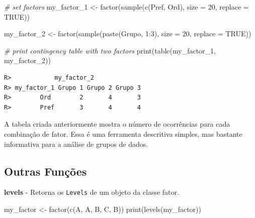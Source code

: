 \documentclass[
  11pt,
]{book}
\newenvironment{Shaded}{\begin{snugshade}}{\end{snugshade}}
\newcommand{\AttributeTok}[1]{\textcolor[rgb]{0.61,0.61,0.61}{#1}}
\newcommand{\CommentTok}[1]{\textcolor[rgb]{0.37,0.37,0.37}{\textit{#1}}}
\newcommand{\ConstantTok}[1]{\textcolor[rgb]{0,0,0}{#1}}
\newcommand{\DecValTok}[1]{\textcolor[rgb]{0.06,0.06,0.06}{#1}}
\newcommand{\FunctionTok}[1]{\textcolor[rgb]{0,0,0}{#1}}
\newcommand{\NormalTok}[1]{#1}
\newcommand{\OtherTok}[1]{\textcolor[rgb]{0.37,0.37,0.37}{#1}}
\newcommand{\SpecialCharTok}[1]{\textcolor[rgb]{0,0,0}{#1}}
\newcommand{\StringTok}[1]{\textcolor[rgb]{0.5,0.5,0.5}{#1}}
\begin{document}
\begin{Shaded}
\begin{Highlighting}[]
\CommentTok{\# set factors}
\NormalTok{my\_factor\_1 }\OtherTok{\textless{}{-}} \FunctionTok{factor}\NormalTok{(}\FunctionTok{sample}\NormalTok{(}\FunctionTok{c}\NormalTok{(}\StringTok{\textquotesingle{}Pref\textquotesingle{}}\NormalTok{, }\StringTok{\textquotesingle{}Ord\textquotesingle{}}\NormalTok{),}
                             \AttributeTok{size =} \DecValTok{20}\NormalTok{,}
                             \AttributeTok{replace =} \ConstantTok{TRUE}\NormalTok{))}

\NormalTok{my\_factor\_2 }\OtherTok{\textless{}{-}} \FunctionTok{factor}\NormalTok{(}\FunctionTok{sample}\NormalTok{(}\FunctionTok{paste}\NormalTok{(}\StringTok{\textquotesingle{}Grupo\textquotesingle{}}\NormalTok{, }\DecValTok{1}\SpecialCharTok{:}\DecValTok{3}\NormalTok{),}
                             \AttributeTok{size =} \DecValTok{20}\NormalTok{,}
                             \AttributeTok{replace =} \ConstantTok{TRUE}\NormalTok{))}

\CommentTok{\# print contingency table with two factors}
\FunctionTok{print}\NormalTok{(}\FunctionTok{table}\NormalTok{(my\_factor\_1, my\_factor\_2))}
\end{Highlighting}
\end{Shaded}

\begin{verbatim}
R>            my_factor_2
R> my_factor_1 Grupo 1 Grupo 2 Grupo 3
R>        Ord        2       4       3
R>        Pref       3       4       4
\end{verbatim}

A tabela criada anteriormente mostra o número de ocorrências para cada combinação de fator. Essa é uma ferramenta descritiva simples, mas bastante informativa para a análise de grupos de dados.

\hypertarget{outras-funuxe7uxf5es}{%
\subsection{Outras Funções}\label{outras-funuxe7uxf5es}}

\textbf{levels} - Retorna os \texttt{Levels} de um objeto da classe fator.

\begin{Shaded}
\begin{Highlighting}[]
\NormalTok{my\_factor }\OtherTok{\textless{}{-}} \FunctionTok{factor}\NormalTok{(}\FunctionTok{c}\NormalTok{(}\StringTok{\textquotesingle{}A\textquotesingle{}}\NormalTok{, }\StringTok{\textquotesingle{}A\textquotesingle{}}\NormalTok{, }\StringTok{\textquotesingle{}B\textquotesingle{}}\NormalTok{, }\StringTok{\textquotesingle{}C\textquotesingle{}}\NormalTok{, }\StringTok{\textquotesingle{}B\textquotesingle{}}\NormalTok{))}
\FunctionTok{print}\NormalTok{(}\FunctionTok{levels}\NormalTok{(my\_factor))}
\end{Highlighting}
\end{Shaded}
\end{document}
